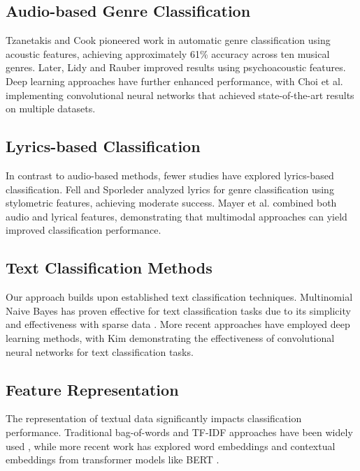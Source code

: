 \documentclass[conference]{IEEEtran}
\begin{document}
\subsection{Audio-based Genre Classification}
Tzanetakis and Cook \cite{tzanetakis2002musical} pioneered work in automatic genre classification using acoustic features, achieving approximately 61\% accuracy across ten musical genres. Later, Lidy and Rauber \cite{lidy2005evaluation} improved results using psychoacoustic features. Deep learning approaches have further enhanced performance, with Choi et al. \cite{choi2017convolutional} implementing convolutional neural networks that achieved state-of-the-art results on multiple datasets.

\subsection{Lyrics-based Classification}
In contrast to audio-based methods, fewer studies have explored lyrics-based classification. Fell and Sporleder \cite{fell2014lyrics} analyzed lyrics for genre classification using stylometric features, achieving moderate success. Mayer et al. \cite{mayer2008rhyme} combined both audio and lyrical features, demonstrating that multimodal approaches can yield improved classification performance.

\subsection{Text Classification Methods}
Our approach builds upon established text classification techniques. Multinomial Naive Bayes has proven effective for text classification tasks due to its simplicity and effectiveness with sparse data \cite{mccallum1998comparison}. More recent approaches have employed deep learning methods, with Kim \cite{kim2014convolutional} demonstrating the effectiveness of convolutional neural networks for text classification tasks.

\subsection{Feature Representation}
The representation of textual data significantly impacts classification performance. Traditional bag-of-words and TF-IDF approaches have been widely used \cite{sebastiani2002machine}, while more recent work has explored word embeddings \cite{mikolov2013distributed} and contextual embeddings from transformer models like BERT \cite{devlin2018bert}.
\end{document}
